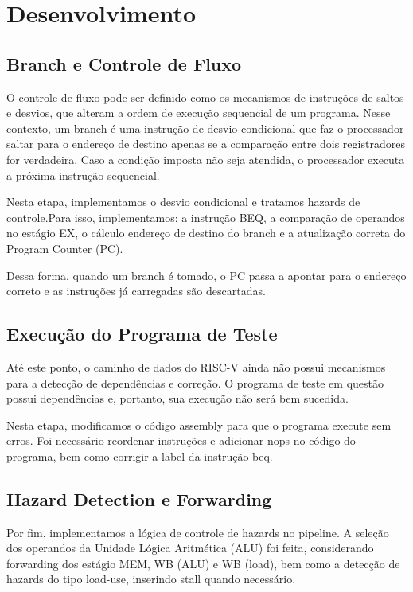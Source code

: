 \documentclass{sbc2023}%
\begin{document}
\section{Desenvolvimento}

\subsection{Branch e Controle de Fluxo}

O controle de fluxo pode ser definido como os mecanismos de instruções de saltos e desvios, que alteram a ordem de execução sequencial de um programa. Nesse contexto, um branch é uma instrução de desvio condicional que faz o processador saltar para o endereço de destino apenas se a comparação entre dois registradores for verdadeira. Caso a condição imposta não seja atendida, o processador executa a próxima instrução sequencial. \cite{patterson2017riscv}

Nesta etapa, implementamos o desvio condicional e tratamos hazards de controle.Para isso, implementamos: a instrução BEQ, a comparação de  operandos no estágio EX, o cálculo endereço de destino do branch e a atualização correta do Program Counter (PC).

Dessa forma, quando um branch é tomado, o PC passa a apontar para o endereço correto e as instruções já carregadas são descartadas.

\subsection{Execução do Programa de Teste}

Até este ponto, o caminho de dados do RISC-V ainda não possui mecanismos para a detecção de dependências e correção. O programa de teste em questão possui dependências e, portanto, sua execução não será bem sucedida. 

Nesta etapa, modificamos o código assembly para que o programa execute sem erros. Foi necessário reordenar instruções e adicionar nops no código do programa, bem como corrigir a label da instrução beq.

\subsection{Hazard Detection e Forwarding}

Por fim, implementamos a lógica de controle de hazards no
pipeline. A seleção dos operandos da Unidade Lógica Aritmética (ALU) foi feita, considerando forwarding dos estágio MEM, WB (ALU) e WB (load), bem como a detecção de hazards do tipo load-use, inserindo stall quando necessário.
\end{document}
